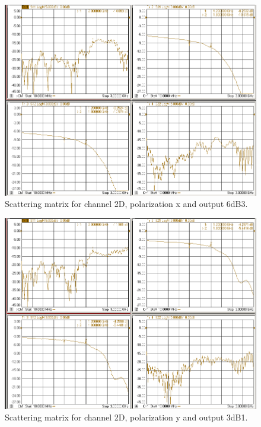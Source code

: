 \documentclass[12pt,a4paper,oneside]{article}
\begin{document}
\begin{figure}[H]
\centering
\includegraphics[width=0.9\linewidth]{VNA_results/2Dx_6dB3.png}
\caption{Scattering matrix for channel 2D, polarization x and output 6dB3.}
\label{fig:2Dx_6dB3}
\end{figure}


\begin{figure}[H]
\centering
\includegraphics[width=0.9\linewidth]{VNA_results/2Dy_3dB1.png}
\caption{Scattering matrix for channel 2D, polarization y and output 3dB1.}
\label{fig:2Dy_3dB1}
\end{figure}
\end{document}
